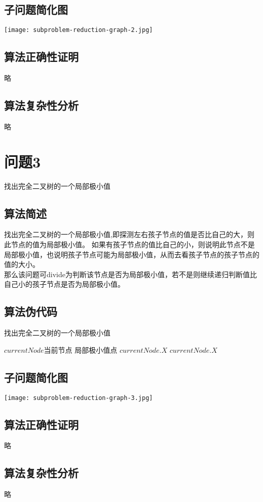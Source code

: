 \documentclass[UTF8]{ctexart}
\begin{document}
\subsection{子问题简化图}
	\texttt{[image: subproblem-reduction-graph-2.jpg]}
	
\subsection{算法正确性证明}
	略

\subsection{算法复杂性分析}
	略
\clearpage

\section{问题3}
找出完全二叉树的一个局部极小值
\subsection{算法简述}
找出完全二叉树的一个局部极小值,即探测左右孩子节点的值是否比自己的大，则此节点的值为局部极小值。
如果有孩子节点的值比自己的小，则说明此节点不是局部极小值，也说明孩子节点可能为局部极小值，从而去看孩子节点的孩子节点的值的大小。\\
那么该问题可divide为判断该节点是否为局部极小值，若不是则继续递归判断值比自己小的孩子节点是否为局部极小值。
\subsection{算法伪代码}
	\begin{algorithm}[H]
		\caption{找出完全二叉树的一个局部极小值} 
		\begin{algorithmic} %
			\Require   $currentNode$当前节点
			\Ensure  局部极小值点
					\State \Return $currentNode.X$
				\Else
						\State \Return $currentNode.X$
					\EndIf
				\EndIf
					\State \Return {}
				\EndIf
					\State \Return {}
				\EndIf
			\EndFunction
		\end{algorithmic}
	\end{algorithm}
\subsection{子问题简化图}
	\texttt{[image: subproblem-reduction-graph-3.jpg]}
	
\subsection{算法正确性证明}
	略

\subsection{算法复杂性分析}
	略
\clearpage %
\end{document}
